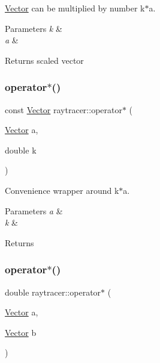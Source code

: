 \hyperlink{classraytracer_1_1Vector}{Vector} can be multiplied by number k$\ast$a. 


\begin{DoxyParams}{Parameters}
{\em k} & \\
\hline
{\em a} & \\
\hline
\end{DoxyParams}
\begin{DoxyReturn}{Returns}
scaled vector 
\end{DoxyReturn}
\mbox{\label{group__api_ga299354d219d40b7431474c15b9718abb}} 
\subsubsection{\texorpdfstring{operator$\ast$()}{operator*()}\hspace{0.1cm}{\footnotesize\ttfamily [2/3]}}
{\footnotesize\ttfamily const \hyperlink{classraytracer_1_1Vector}{Vector} raytracer\+::operator$\ast$ (\begin{DoxyParamCaption}\item[{\hyperlink{classraytracer_1_1Vector}{Vector}}]{a,  }\item[{double}]{k }\end{DoxyParamCaption})}



Convenience wrapper around k$\ast$a. 


\begin{DoxyParams}{Parameters}
{\em a} & \\
\hline
{\em k} & \\
\hline
\end{DoxyParams}
\begin{DoxyReturn}{Returns}

\end{DoxyReturn}
\mbox{\label{group__api_gac6d4df29b0f3bc91c6744edb04582ef7}} 
\subsubsection{\texorpdfstring{operator$\ast$()}{operator*()}\hspace{0.1cm}{\footnotesize\ttfamily [3/3]}}
{\footnotesize\ttfamily double raytracer\+::operator$\ast$ (\begin{DoxyParamCaption}\item[{\hyperlink{classraytracer_1_1Vector}{Vector}}]{a,  }\item[{\hyperlink{classraytracer_1_1Vector}{Vector}}]{b }\end{DoxyParamCaption})}



